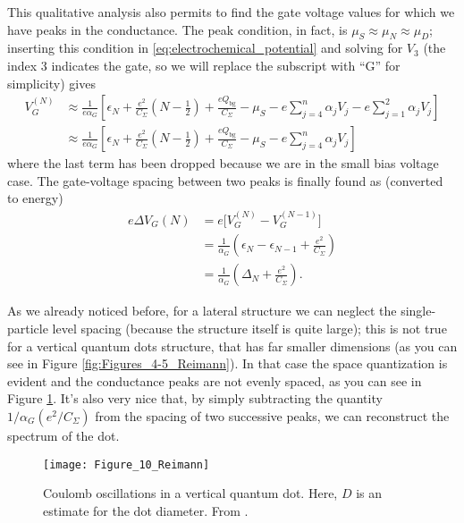 This qualitative analysis also permits to find the gate voltage values for which we have peaks in the conductance. The peak condition, in fact, is $\mu_S\approx\mu_N\approx\mu_D$; inserting this condition in \eqref{eq:electrochemical_potential} and solving for $V_3$ (the index 3 indicates the gate, so we will replace the subscript with ``G'' for simplicity) gives
\begin{align}
	V_G^{(N)}
	&\approx \frac{1}{e\alpha_G}\left[ \epsilon_N + \frac{e^2}{C_{\Sigma}}\left(N-\frac{1}{2}\right) + \frac{eQ_{\text{bg}}}{C_{\Sigma}} - \mu_S - e\sum_{j=4}^{n}\alpha_jV_j - e\sum_{j=1}^{2}\alpha_jV_j \right] \\
	&\approx \frac{1}{e\alpha_G}\left[ \epsilon_N + \frac{e^2}{C_{\Sigma}}\left(N-\frac{1}{2}\right) + \frac{eQ_{\text{bg}}}{C_{\Sigma}} - \mu_S - e\sum_{j=4}^{n}\alpha_jV_j \right]
\end{align}
where the last term has been dropped because we are in the small bias voltage case. The gate-voltage spacing between two peaks is finally found as (converted to energy)
\begin{align}
	e\Delta V_G(N) 
	&= e\Big[V_G^{(N)}-V_G^{(N-1)}\Big] \\
	&= \frac{1}{\alpha_G}\left( \epsilon_N - \epsilon_{N-1} + \frac{e^2}{C_{\Sigma}} \right) \\
	&= \frac{1}{\alpha_G}\left( \Delta_N + \frac{e^2}{C_{\Sigma}} \right).
	\label{eq:DeltaVG_N_Vb0}
\end{align}

As we already noticed before, for a lateral structure we can neglect the single-particle level spacing (because the structure itself is quite large); this is not true for a vertical quantum dots structure, that has far smaller dimensions (as you can see in Figure \ref{fig:Figures_4-5_Reimann}). In that case the space quantization is evident and the conductance peaks are not evenly spaced, as you can see in Figure \ref{fig:Figure_10_Reimann}. It's also very nice that, by simply subtracting the quantity $1 / \alpha_G (e^2 / C_{\Sigma})$ from the spacing of two successive peaks, we can reconstruct the spectrum of the dot.

\begin{figure}[h]%
	\centering
    \texttt{[image: Figure\_10\_Reimann]}
    \caption{Coulomb oscillations in a vertical quantum dot. Here, $D$ is an estimate for the dot diameter. From \cite{Tarucha1996}.}
	\label{fig:Figure_10_Reimann}
\end{figure}

